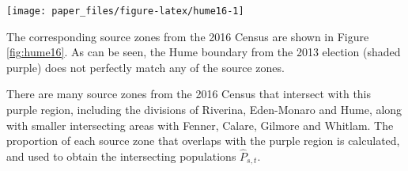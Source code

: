 \documentclass[times, doublespace]{anzsauth}
\let\origfigure\figure
\let\endorigfigure\endfigure
\renewenvironment{figure}[1][2] {
    \expandafter\origfigure\expandafter[htbp]
} {
    \endorigfigure
}
\let\origtable\table
\let\endorigtable\endtable
\renewenvironment{table}[1][2] {
    \expandafter\origtable\expandafter[htbp]
} {
    \endorigtable
}
\begin{document}
\begin{figure}[h]

{\centering \texttt{[image: paper\_files/figure-latex/hume16-1]} 

}

\caption{Census division boundaries in NSW for 2016, with the 2013 electoral boundary for Hume, shown in purple. The purple region is not contained within a single Census division.}\label{fig:hume16}
\end{figure}

The corresponding source zones from the 2016 Census are shown in Figure \ref{fig:hume16}. As can be seen, the Hume boundary from the 2013 election (shaded purple) does not perfectly match any of the source zones.

There are many source zones from the 2016 Census that intersect with this purple region, including the divisions of Riverina, Eden-Monaro and Hume, along with smaller intersecting areas with Fenner, Calare, Gilmore and Whitlam. The proportion of each source zone that overlaps with the purple region is calculated, and used to obtain the intersecting populations \(\hat{P}_{s,t}\).

\begin{table}[t]

\caption{\label{tab:hume1}Population from each intersecting Census source zone (2016) that is allocated to the target zone (purple region - Hume electoral boundary in 2013), and the corresponding proportion of Australian citizens in each of these source zones.}
\centering
{}
\end{table}
\end{document}
